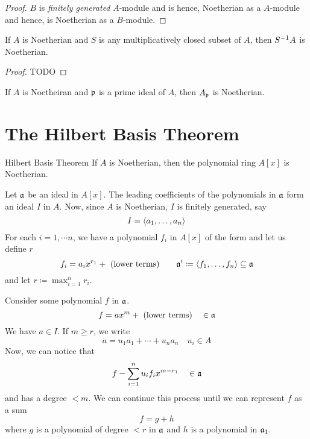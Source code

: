 \begin{proof}
	\(B\) is \emph{finitely generated} \(A\)-module and is hence,
	Noetherian as a \(A\)-module and hence, is Noetherian as a
	\(B\)-module.
\end{proof}

\begin{proposition}{}{}
	If \(A\) is Noetherian and \(S\) is any multiplicatively closed
	subset of \(A\), then \(S\inv A\) is Noetherian.
\end{proposition}

\begin{proof}
	TODO  %
\end{proof}

\begin{corollary}{}{}
	If \(A\) is Noetheiran and \(\mfp\) is a prime ideal of \(A\),
	then \(A_{\mfp}\) is Noetherian.
\end{corollary}



\section{The Hilbert Basis Theorem}
\label{sec:noetherian_rings_hilbert_basis_theorem}

\begin{theorem}{Hilbert Basis Theorem}{}
	If \(A\) is Noetherian, then the polynomial ring
	\(A[x]\) is Noetherian.
\end{theorem}


Let \(\mfa\) be an ideal in \(A[x]\).
The leading coefficients of the polynomials in \(\mfa\) form an ideal
\(I\) in \(A\).
Now, since \(A\) is Noetherian, \(I\) is finitely generated, say
\[
	I = \ang*{a_1, \ldots, a_n}
\]
For each \(i = 1, \cdots n\), we have a polynomial \(f_i\) in \(A[x]\)
of the form and let us define \(r\)
\[
	f_i = a_i x^{r_1} + \text{ (lower terms)}
	\quad\quad \mfa' \coloneqq \ang{f_1, \ldots, f_n} \subseteq \mfa
\]
and let \(r \coloneqq \max_{i=1}^n r_i\).

Consider some polynomial \(f\) in \(\mfa\).
\[
	f = ax^m + \text{ (lower terms)} \quad \in \mfa
\]
We have \(a \in I\).
If \(m \geq r\), we write
\[
	a = u_1 a_1 + \cdots + u_n a_n \quad u_i \in A
\]
Now, we can notice that
\[
	f - \sum_{i=1}^n u_i f_i x^{m - r_1} \quad \in \mfa
\]
and has a degree \(< m\).
We can continue this process until we can represent \(f\) as a sum
\[
	f = g + h
\]
where \(g\) is a polynomial of degree \(< r\) in \(\mfa\)
and \(h\) is a polynomial in \(\mfa_1\).

